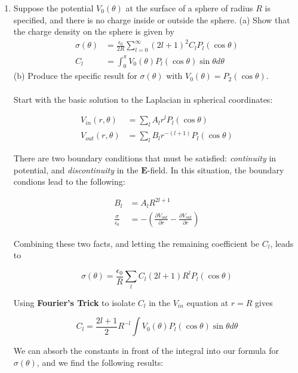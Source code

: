 \documentclass[10pt]{article}
\begin{document}
\begin{enumerate}
\item Suppose the potential $V_0(\theta)$ at the surface of a sphere of radius $R$ is specified, and there is no charge inside or outside the sphere.  (a) Show that the charge density on the sphere is given by
\begin{align}
\sigma(\theta) &= \frac{\epsilon_0}{2R} \sum_{l=0}^{\infty} (2l+1)^2 C_l P_l(\cos\theta) \\
C_l &= \int_0^{\pi} V_0(\theta) P_l (\cos\theta) \sin\theta d\theta
\end{align}
(b) Produce the specific result for $\sigma(\theta)$ with $V_0(\theta) = P_2(\cos\theta)$. \\ \\

Start with the basic solution to the Laplacian in spherical coordinates:

\begin{align}
V_{in} (r,\theta) &= \sum_{l} A_l r^l P_l(\cos\theta) \\
V_{out} (r,\theta) &= \sum_{l} B_l r^{-(l+1)} P_l(\cos\theta)
\end{align}

There are two boundary conditions that must be satisfied: \textit{continuity} in potential, and \textit{discontinuity} in the $\mathbf{E}$-field.  In this situation, the boundary condions lead to the following:

\begin{align}
B_l &= A_l R^{2l+1} \\
\frac{\sigma}{\epsilon_0} &= -\left(\frac{\partial V_{out}}{\partial r} - \frac{\partial V_{out}}{\partial r}\right)
\end{align}

Combining these two facts, and letting the remaining coefficient be $C_l$, leads to

\begin{equation}
\sigma(\theta) = \frac{\epsilon_0}{R}\sum_l C_l (2l+1) R^l P_l(\cos\theta)
\end{equation}

Using \textbf{Fourier's Trick} to isolate $C_l$ in the $V_{in}$ equation at $r = R$ gives

\begin{equation}
C_l = \frac{2l+1}{2}R^{-l} \int V_0(\theta) P_l(\cos\theta) \sin\theta d\theta
\end{equation}

We can absorb the constants in front of the integral into our formula for $\sigma(\theta)$, and we find the following results:


\end{enumerate}
\end{document}
